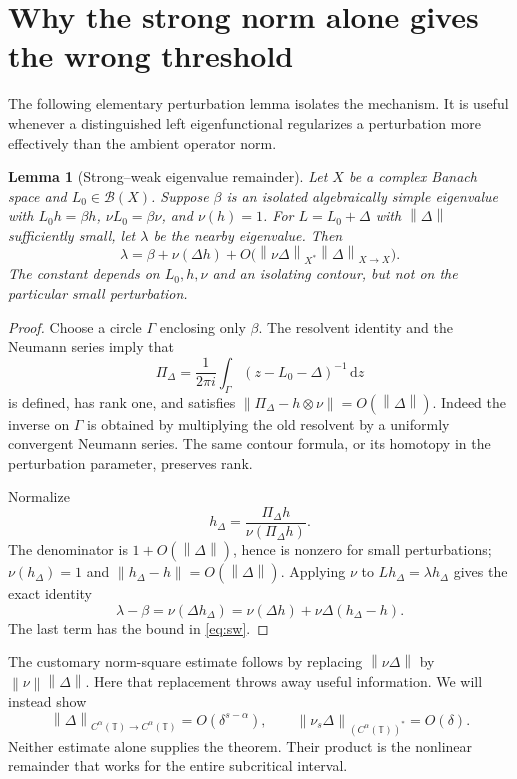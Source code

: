 \documentclass[11pt,a4paper]{article}
\numberwithin{equation}{section}
\newtheorem{lemma}[lemma]{Lemma}
\theoremstyle{definition}
\theoremstyle{remark}
\newcommand{\TT}{\mathbb T}
\newcommand{\dd}{\,\mathrm d}
\newcommand{\norm}[1]{\left\lVert#1\right\rVert}
\newcommand{\Proj}{\Pi}
\newcommand{\Holder}{C^\alpha(\TT)}
\begin{document}
\section{Why the strong norm alone gives the wrong threshold}
\label{sec:perturbation}

The following elementary perturbation lemma isolates the mechanism. It
is useful whenever a distinguished left eigenfunctional regularizes a
perturbation more effectively than the ambient operator norm.

\begin{lemma}[Strong--weak eigenvalue remainder]
\label{lem:sw}
Let $X$ be a complex Banach space and $L_0\in\mathcal B(X)$. Suppose
$\beta$ is an isolated algebraically simple eigenvalue with
$L_0h=\beta h$, $\nu L_0=\beta\nu$, and $\nu(h)=1$.
For $L=L_0+\Delta$ with $\norm\Delta$ sufficiently small, let $\lambda$
be the nearby eigenvalue. Then
\begin{equation}
 \lambda=\beta+\nu(\Delta h)
       +O\bigl(\norm{\nu\Delta}_{X^*}\norm\Delta_{X\to X}\bigr).
 \label{eq:sw}
\end{equation}
The constant depends on $L_0,h,\nu$ and an isolating contour, but not
on the particular small perturbation.
\end{lemma}
\begin{proof}
Choose a circle $\Gamma$ enclosing only $\beta$. The resolvent identity
and the Neumann series imply that
\[
 \Proj_\Delta=\frac{1}{2\pi i}\int_\Gamma(z-L_0-\Delta)^{-1}\dd z
\]
is defined, has rank one, and satisfies
$\norm{\Proj_\Delta-h\otimes\nu}=O(\norm\Delta)$.
Indeed the inverse on $\Gamma$ is obtained by multiplying the old
resolvent by a uniformly convergent Neumann series. The same contour
formula, or its homotopy in the perturbation parameter, preserves rank.

Normalize
\[
 h_\Delta=\frac{\Proj_\Delta h}{\nu(\Proj_\Delta h)}.
\]
The denominator is $1+O(\norm\Delta)$, hence is nonzero for small
perturbations; $\nu(h_\Delta)=1$ and
$\norm{h_\Delta-h}=O(\norm\Delta)$.
Applying $\nu$ to $Lh_\Delta=\lambda h_\Delta$ gives the exact identity
\[
 \lambda-\beta=\nu(\Delta h_\Delta)
 =\nu(\Delta h)+\nu\Delta(h_\Delta-h).
\]
The last term has the bound in \cref{eq:sw}.
\end{proof}

The customary norm-square estimate follows by replacing
$\norm{\nu\Delta}$ by $\norm\nu\norm\Delta$. Here that replacement
throws away useful information. We will instead show
\begin{equation}
 \norm\Delta_{\Holder\to\Holder}=O(\delta^{s-\alpha}),
 \qquad
 \norm{\nu_s\Delta}_{(\Holder)^*}=O(\delta).
 \label{eq:two-norms}
\end{equation}
Neither estimate alone supplies the theorem. Their product is the
nonlinear remainder that works for the entire subcritical interval.
\end{document}
